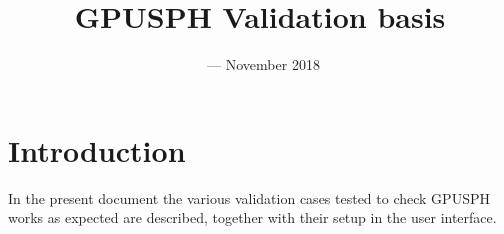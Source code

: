 \documentclass{../GPUSPHtemplate}
\title{GPUSPH Validation basis}
\author{}
\date{\currentver\ --- November 2018}
\begin{document}
\maketitle
\tableofcontents
\clearpage
\section{Introduction}

In the present document the various validation cases tested to check GPUSPH works as expected
are described, together with their setup in the user interface.

%
%
%   
%
\end{document}
